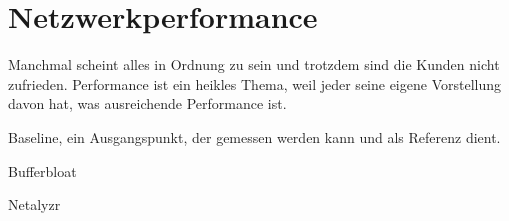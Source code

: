 \chapter{Netzwerkperformance}
\label{cha:netz-performance}

\begin{abstractsec}
  Manchmal scheint alles in Ordnung zu sein und trotzdem sind die Kunden nicht
  zufrieden. Performance ist ein heikles Thema, weil jeder seine eigene
  Vorstellung davon hat, was ausreichende Performance ist.
\end{abstractsec}

\begin{notes}
\item Baseline, ein Ausgangspunkt, der gemessen werden kann und als Referenz
  dient.
\item Bufferbloat
\item Netalyzr
\end{notes}

